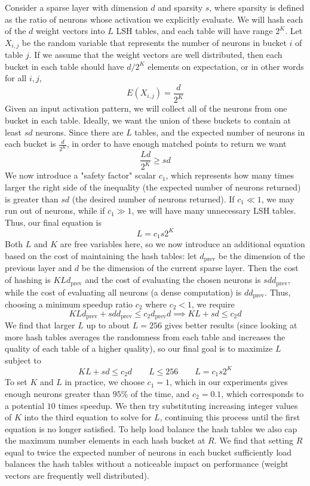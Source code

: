\documentclass[sigconf]{acmart}
\begin{document}
Consider a sparse layer with dimension $d$ and sparsity $s$, where sparsity is defined as the ratio of neurons whose activation we explicitly evaluate. We will hash each of the $d$ weight vectors into $L$ LSH tables, and each table will have range $2^K$. Let $X_{i, j}$ be the random variable that represents the number of neurons in bucket $i$ of table $j$. If we assume that the weight vectors are well distributed, then each bucket in each table should have $d / 2^K$ elements on expectation, or in other words for all $i, j$,
$$E(X_{i, j}) = \frac{d}{2^K}$$
Given an input activation pattern, we will collect all of the neurons from one bucket in each table. Ideally, we want the union of these buckets to contain at least $sd$ neurons. Since there are $L$ tables, and the expected number of neurons in each bucket is $\frac{d}{2^K}$, in order to have enough matched points to return we want
$$\frac{Ld}{2^K} \ge sd$$
We now introduce a "safety factor" scalar $c_1$, which represents how many times larger the right side of the inequality (the expected number of neurons returned) is greater than $sd$ (the desired number of neurons returned). If $c_1 \ll 1$, we may run out of neurons, while if $c_1 \gg 1$, we will have many unnecessary LSH tables. Thus, our final equation is
$$L = c_1s2^K$$
Both $L$ and $K$ are free variables here, so we now introduce an additional equation based on the cost of maintaining the hash tables: let $d_{\mathrm{prev}}$ be the dimension of the previous layer and $d$ be the dimension of the current sparse layer. Then the cost of hashing is $KLd_{\mathrm{prev}}$ and the cost of evaluating the chosen neurons is $sdd_{\mathrm{prev}}$, while the cost of evaluating all neurons (a dense computation) is $dd_{\mathrm{prev}}$. Thus, choosing a minimum speedup ratio $c_2$ where $c_2 < 1$, we require 
$$KLd_{\mathrm{prev}} + sdd_{\mathrm{prev}} \le c_2 d_{\mathrm{prev}}d \implies KL + sd \le c_2d$$ 
We find that larger $L$ up to about $L = 256$ gives better results (since looking at more hash tables averages the randomness from each table and increases the quality of each table of a higher quality), so our final goal is to maximize $L$ subject to 
$$KL + sd \le c_2d \qquad L \le 256 \qquad L = c_1s2^K $$
To set $K$ and $L$ in practice, we choose $c_1 = 1$, which in our experiments gives enough neurons greater than $95$\% of the time, and $c_2 = 0.1$, which corresponds to a potential $10$ times speedup. We then try substituting increasing integer values of $K$ into the third equation to solve for $L$, continuing this process until the first equation is no longer satisfied. To help load balance the hash tables we also cap the maximum number elements in each hash bucket at $R$. We find that setting $R$ equal to twice the expected number of neurons in each bucket sufficiently load balances the hash tables without a noticeable impact on performance (weight vectors are frequently well distributed).
\end{document}
